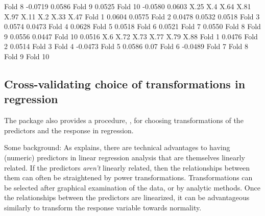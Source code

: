 \documentclass[
]{jss}
\begin{document}
\begin{CodeChunk}
\begin{CodeOutput}
Fold 8  -0.0719                                          0.0586                
Fold 9                   0.0525                                                
Fold 10 -0.0580                                  0.0603                        
           X.25     X.4    X.64    X.81    X.97    X.11     X.2    X.33    X.47
Fold 1                                   0.0604          0.0575                
Fold 2   0.0478          0.0532  0.0518                                        
Fold 3                           0.0574                          0.0473        
Fold 4                   0.0628                                                
Fold 5   0.0518                                                                
Fold 6                                           0.0521                        
Fold 7           0.0550                                                        
Fold 8                                                                         
Fold 9                                   0.0556                          0.0447
Fold 10          0.0516                                                        
            X.6    X.72    X.73    X.77    X.79 X.88
Fold 1   0.0476                                     
Fold 2                   0.0514                     
Fold 3                                              
Fold 4                                  -0.0473     
Fold 5           0.0586                         0.07
Fold 6                          -0.0489             
Fold 7                                              
Fold 8                                              
Fold 9                                              
Fold 10                                             
\end{CodeOutput}
\end{CodeChunk}

\hypertarget{cross-validating-choice-of-transformations-in-regression}{%
\subsection{Cross-validating choice of transformations in
regression}\label{cross-validating-choice-of-transformations-in-regression}}

The  package also provides a  procedure,
, for choosing transformations of the predictors and
the response in regression.

Some background: As \citet[Sec. 8.2]{Weisberg:2014} explains, there are
technical advantages to having (numeric) predictors in linear regression
analysis that are themselves linearly related. If the predictors
\emph{aren't} linearly related, then the relationships between them can
often be straightened by power transformations. Transformations can be
selected after graphical examination of the data, or by analytic
methods. Once the relationships between the predictors are linearized,
it can be advantageous similarly to transform the response variable
towards normality.
\end{document}
